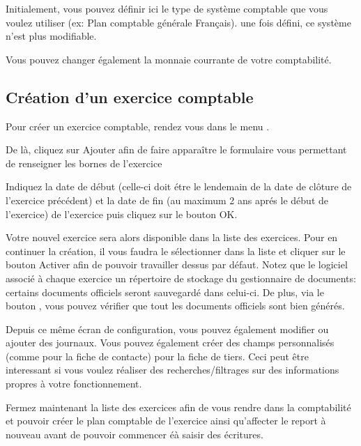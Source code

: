 \documentclass[a4paper,10pt,oneside,french]{sphinxmanual}
\begin{document}
Initialement, vous pouvez définir ici le type de système comptable que
vous voulez utiliser (ex: Plan comptable générale Français).
 une fois défini, ce système n’est plus modifiable.

Vous pouvez changer également la monnaie courrante de votre comptabilité.


\subsection{Création d’un exercice comptable}
\label{\detokenize{accounting/fiscalyear:creation-d-un-exercice-comptable}}
Pour créer un exercice comptable, rendez vous dans le menu .
\begin{quote}

\noindent{}
\end{quote}

De là, cliquez sur Ajouter afin de faire apparaître le formulaire vous permettant de renseigner les bornes de l’exercice
\begin{quote}

\noindent{}
\end{quote}

Indiquez la date de début (celle-ci doit étre le lendemain de la date
de clôture de l’exercice précédent) et la date de fin (au maximum 2 ans
aprés le début de l’exercice) de l’exercice puis cliquez sur le bouton
OK.

Votre nouvel exercice sera alors disponible dans la
liste des exercices. Pour en continuer la création, il vous faudra le
sélectionner dans la liste et cliquer sur le bouton Activer afin de
pouvoir travailler dessus par défaut.
Notez que le logiciel associé à chaque exercice un répertoire de stockage du gestionnaire de documents: certains documents officiels seront sauvegardé dans celui-ci.
De plus, via le bouton , vous pouvez vérifier que tout les documents officiels sont bien générés.

Depuis ce même écran de configuration, vous pouvez également modifier
ou ajouter des journaux.
Vous pouvez également créer des champs personnalisés (comme pour la fiche de contacte)
pour la fiche de tiers. Ceci peut être interessant si vous voulez réaliser des recherches/filtrages
sur des informations propres à votre fonctionnement.

Fermez maintenant la liste des exercices afin de vous rendre dans la comptabilité et
pouvoir créer le plan comptable de l’exercice ainsi qu’affecter le
report à nouveau avant de pouvoir commencer éà saisir des écritures.
\end{document}
